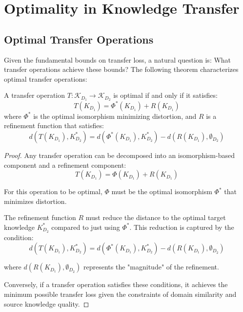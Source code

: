 \section{Optimality in Knowledge Transfer}

\subsection{Optimal Transfer Operations}

Given the fundamental bounds on transfer loss, a natural question is: What transfer operations achieve these bounds? The following theorem characterizes optimal transfer operations:

\begin{theorem}
A transfer operation $T: \mathcal{K}_{D_1} \to \mathcal{K}_{D_2}$ is optimal if and only if it satisfies:
\begin{equation}
T(K_{D_1}) = \Phi^*(K_{D_1}) + R(K_{D_1})
\end{equation}
where $\Phi^*$ is the optimal isomorphism minimizing distortion, and $R$ is a refinement function that satisfies:
\begin{equation}
d(T(K_{D_1}), K_{D_2}^*) = d(\Phi^*(K_{D_1}), K_{D_2}^*) - d(R(K_{D_1}), \emptyset_{D_2})
\end{equation}
\end{theorem}

\begin{proof}
Any transfer operation can be decomposed into an isomorphism-based component and a refinement component:
\begin{equation}
T(K_{D_1}) = \Phi(K_{D_1}) + R(K_{D_1})
\end{equation}

For this operation to be optimal, $\Phi$ must be the optimal isomorphism $\Phi^*$ that minimizes distortion.

The refinement function $R$ must reduce the distance to the optimal target knowledge $K_{D_2}^*$ compared to just using $\Phi^*$. This reduction is captured by the condition:
\begin{equation}
d(T(K_{D_1}), K_{D_2}^*) = d(\Phi^*(K_{D_1}), K_{D_2}^*) - d(R(K_{D_1}), \emptyset_{D_2})
\end{equation}

where $d(R(K_{D_1}), \emptyset_{D_2})$ represents the "magnitude" of the refinement.

Conversely, if a transfer operation satisfies these conditions, it achieves the minimum possible transfer loss given the constraints of domain similarity and source knowledge quality.
\end{proof}

